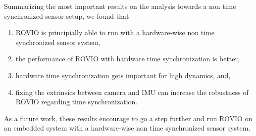 Summarizing the most important results on the analysis towards a non time synchronized sensor setup, we found that

\begin{enumerate}
\item ROVIO is principially able to run with a hardware-wise non time synchronized sensor system,
\item the performance of ROVIO with hardware time synchronization is better,
\item hardware time synchronization gets important for high dynamics, and,
\item fixing the extrinsics between camera and IMU can increase the robustness of ROVIO regarding time synchronization.
\end{enumerate}

As a future work, these results encourage to go a step further and run ROVIO on an embedded system with a hardware-wise non time synchronized sensor system.













